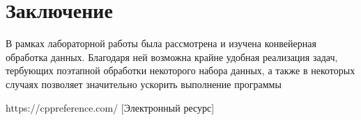 \documentclass[12pt, a4paper]{report}
\begin{document}
	\chapter*{Заключение}
	\hspace{0.5cm}В рамках лабораторной работы была рассмотрена и изучена конвейерная обработка данных. Благодаря ней возможна крайне удобная реализация задач, тербующих поэтапной обработки некоторого набора данных, а также в некоторых случаях позволяет значительно ускорить выполнение программы
	
	\newpage
	
	\begin{thebibliography}{}
	 https://cppreference.com/ [Электронный ресурс]
	\end{thebibliography}
\end{document}
